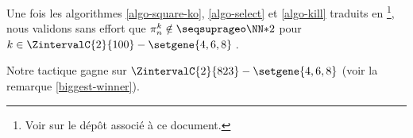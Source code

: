 \leavevmode
\smallskip

Une fois les algorithmes \ref{algo-square-ko}, \ref{algo-select} et \ref{algo-kill} traduits en \python
\footnote{
	Voir sur le dépôt associé à ce document.
},
nous validons sans effort que $\consprod \notin \NNssquare$ pour $k \in \ZintervalC{2}{100} - \setgene{4, 6, 8}$\,.


\begin{remark}
	Notre tactique gagne sur $\ZintervalC{2}{823} - \setgene{4, 6, 8}$ (voir la remarque \ref{biggest-winner}).
\end{remark}
